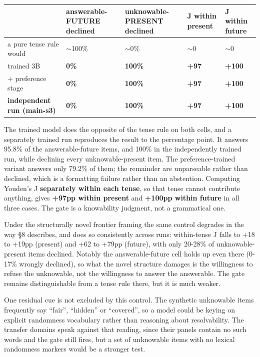 \documentclass[10pt]{article}
\newcommand{\tablefont}{\fontsize{8.7pt}{11.5pt}\selectfont}
\begin{document}
\begin{table}[!htbp]
\centering
\tablefont
\begin{tabular}{|F{3.2cm}|M{2.8cm}|M{2.8cm}|M{2.4cm}|M{2.4cm}|}
\hline
{} & \textbf{answerable-FUTURE declined} & \textbf{unknowable-PRESENT declined} & \textbf{J within present} & \textbf{J within future} \\
\hline
a pure tense rule would & $\sim$100\% & $\sim$0\% & $\sim$0 & $\sim$0 \\
\hline
trained 3B & \textbf{0\%} & \textbf{100\%} & \textbf{+97} & \textbf{+100} \\
\hline
+ preference stage & \textbf{0\%} & \textbf{100\%} & \textbf{+97} & \textbf{+100} \\
\hline
\textbf{independent run (main-s3)} & \textbf{0\%} & \textbf{100\%} & \textbf{+97} & \textbf{+100} \\
\hline
\end{tabular}
\end{table}

The trained model does the opposite of the tense rule on both cells, and a separately trained run reproduces the result to the percentage point. It answers 95.8\% of the answerable-future items, and 100\% in the independently trained run, while declining every unknowable-present item. The preference-trained variant answers only 79.2\% of them; the remainder are unparseable rather than declined, which is a formatting failure rather than an abstention. Computing Youden's J \textbf{separately within each tense}, so that tense cannot contribute anything, gives \textbf{+97pp within present} and \textbf{+100pp within future} in all three cases. The gate is a knowability judgment, not a grammatical one.

Under the structurally novel frontier framing the same control degrades in the way \S8 describes, and does so consistently across runs: within-tense J falls to +18 to +19pp (present) and +62 to +79pp (future), with only 20-28\% of unknowable-present items declined. Notably the answerable-future cell holds up even there (0-17\% wrongly declined), so what the novel structure damages is the willingness to refuse the unknowable, not the willingness to answer the answerable. The gate remains distinguishable from a tense rule there, but it is much weaker.

One residual cue is not excluded by this control. The synthetic unknowable items frequently say ``fair'', ``hidden'' or ``covered'', so a model could be keying on explicit randomness vocabulary rather than reasoning about resolvability. The transfer domains speak against that reading, since their panels contain no such words and the gate still fires, but a set of unknowable items with no lexical randomness markers would be a stronger test.
\end{document}
